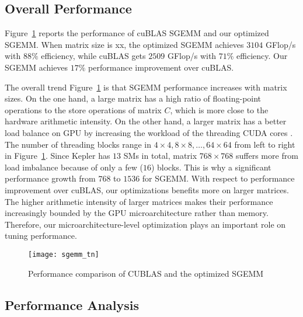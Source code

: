 \subsection{Overall Performance}
Figure~\ref{fig:sgemm_tn} reports the performance of cuBLAS SGEMM and our optimized SGEMM.
When matrix size is xx, the optimized SGEMM achieves $3104$ GFlop/s with $88\%$ efficiency, while cuBLAS gets $2509$ GFlop/s with $71\%$ efficiency. 
Our SGEMM achieves $17\%$ performance improvement over cuBLAS.

The overall trend Figure~\ref{fig:sgemm_tn} is that SGEMM performance increases with matrix sizes. 
On the one hand, a large matrix has a high ratio of 
floating-point operations to the store operations of matrix $C$, which is more close to the hardware arithmetic intensity. 
On the other hand, a larger matrix has a better load balance on GPU by increasing the workload of the threading CUDA cores . 
The number of threading blocks range in $4 \times 4, 8 \times 8, \dots, 64 \times 64$ from left to right in Figure~\ref{fig:sgemm_tn}.
Since Kepler has $13$ SMs in total, matrix $768\times 768$ suffers more from load imbalance because of only a few ($16$) blocks. 
This is why a significant performance growth from $768$ to $1536$ for SGEMM. 
With respect to performance improvement over cuBLAS, our optimizations benefits more on larger matrices. 
The higher arithmetic intensity of larger matrices makes their performance increasingly bounded by the GPU microarchitecture rather than memory. 
Therefore, our microarchitecture-level optimization plays an important role on tuning 
performance.

\begin{figure}[htbp]
\begin{center}
\texttt{[image: sgemm\_tn]}
\caption{Performance comparison of CUBLAS and the optimized SGEMM }
\label{fig:sgemm_tn}
\end{center}
\end{figure}

\subsection{Performance Analysis}

